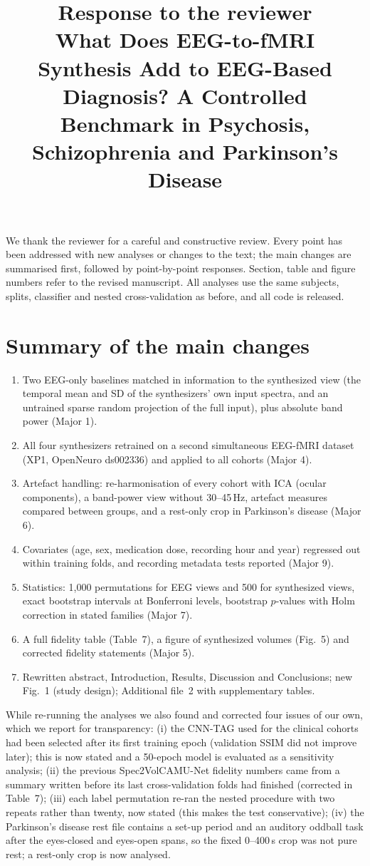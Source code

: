 \documentclass[11pt]{article}
\title{Response to the reviewer\\[4pt]\large What Does EEG-to-fMRI Synthesis Add to EEG-Based Diagnosis? A Controlled Benchmark in Psychosis, Schizophrenia and Parkinson's Disease}
\date{}
\begin{document}
\maketitle

We thank the reviewer for a careful and constructive review. Every point has been addressed with new analyses or changes to the text; the main changes are summarised first, followed by point-by-point responses. Section, table and figure numbers refer to the revised manuscript. All analyses use the same subjects, splits, classifier and nested cross-validation as before, and all code is released.

\section*{Summary of the main changes}
\begin{enumerate}
\item Two EEG-only baselines matched in information to the synthesized view (the temporal mean and SD of the synthesizers' own input spectra, and an untrained sparse random projection of the full input), plus absolute band power (Major 1).
\item All four synthesizers retrained on a second simultaneous EEG-fMRI dataset (XP1, OpenNeuro ds002336) and applied to all cohorts (Major 4).
\item Artefact handling: re-harmonisation of every cohort with ICA (ocular components), a band-power view without 30--45\,Hz, artefact measures compared between groups, and a rest-only crop in Parkinson's disease (Major 6).
\item Covariates (age, sex, medication dose, recording hour and year) regressed out within training folds, and recording metadata tests reported (Major 9).
\item Statistics: 1,000 permutations for EEG views and 500 for synthesized views, exact bootstrap intervals at Bonferroni levels, bootstrap $p$-values with Holm correction in stated families (Major 7).
\item A full fidelity table (Table~7), a figure of synthesized volumes (Fig.~5) and corrected fidelity statements (Major 5).
\item Rewritten abstract, Introduction, Results, Discussion and Conclusions; new Fig.~1 (study design); Additional file~2 with supplementary tables.
\end{enumerate}
While re-running the analyses we also found and corrected four issues of our own, which we report for transparency: (i) the CNN-TAG used for the clinical cohorts had been selected after its first training epoch (validation SSIM did not improve later); this is now stated and a 50-epoch model is evaluated as a sensitivity analysis; (ii) the previous Spec2VolCAMU-Net fidelity numbers came from a summary written before its last cross-validation folds had finished (corrected in Table~7); (iii) each label permutation re-ran the nested procedure with two repeats rather than twenty, now stated (this makes the test conservative); (iv) the Parkinson's disease rest file contains a set-up period and an auditory oddball task after the eyes-closed and eyes-open spans, so the fixed 0--400\,s crop was not pure rest; a rest-only crop is now analysed.
\end{document}
